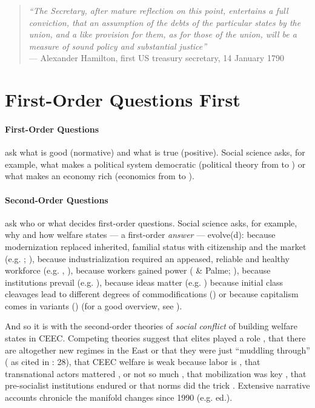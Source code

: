 \documentclass[11pt,a4paper,oneside,openright]{article}
\begin{document}
\begin{quote}
	\emph{``The Secretary, after mature reflection on this point, entertains a full conviction, that an assumption of the debts of the particular states by the union, and a like provision for them, as for those of the union, will be a measure of sound policy and substantial justice''\\}
	--- Alexander Hamilton, first US treasury secretary, 14 January 1790
\end{quote}

\newpage

\section{First-Order Questions First}%

\paragraph{First-Order Questions} ask what is good (normative) and what is true (positive). 
Social science asks, for example, what makes a political system democratic (political theory from \citeauthor{Aristoteles} to \citeauthor{Dahl-1989-aa}) or what makes an economy rich (economics from \citeauthor{Smith-1776-lq} to \citeauthor{Hicks1939}).

\paragraph{Second-Order Questions} ask who or what decides first-order questions. Social science asks, for example, why and how welfare states --- a first-order \emph{answer} --- evolve(d): because modernization replaced inherited, familial status with citizenship and the market (e.g. \citeauthor{Titmuss1974}; \citeauthor{Marshall-1950-aa}), because industrialization required an appeased, reliable and healthy workforce (e.g. \citeauthor{Flora1981}, \citeauthor{Wilensky1975}), because workers gained power (\citeauthor{Korpi1983} \& Palme; \citeauthor{Jessop2002}), because institutions prevail (e.g. \citeauthor{Rothstein}), because ideas matter (e.g. \citeauthor{Stiller2009}) because initial class cleavages lead to different degrees of commodifications (\citeauthor{Esping-Andersen-1990-aa}) or because capitalism comes in variants (\citeauthor{HallSoskice-2001-aa}) (for a good overview, see \citealt{Beland2008}).

And so it is with the second-order theories of \emph{social conflict} of building welfare states in \gls{CEEC}. Competing theories suggest that elites played a role \citep{Aidukaite2006}, that there are altogether new regimes in the East \citep{Cerami2006} or that they were just ``muddling through'' (\citealt{Kovasc} as cited in \citealt{Fuchs2008}: 28), that \gls{CEEC} welfare is weak because labor is \citep{Crowley2002}, that transnational actors mattered \citep{Orenstein2009}, or not so much \citep{Sissenich2005}, that mobilization was key \citep{Vanhuysse2006a}, that pre-socialist institutions endured \citep{Inglot2008} or that norms did the trick \citep{Schimmelfennig2001}. Extensive narrative accounts chronicle the manifold changes since 1990 (e.g. \citealt{Deacon1992} ed.). 
\end{document}
